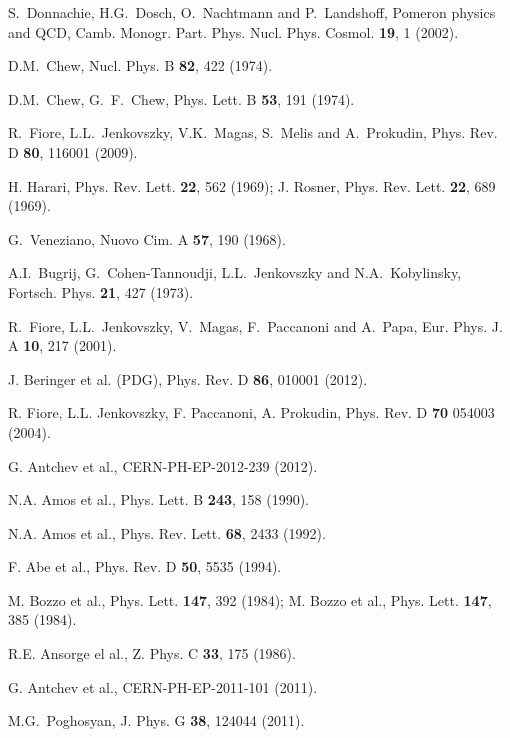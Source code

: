\documentclass[12pt]{article}
\begin{document}
\begin{thebibliography}{9}
  S.~Donnachie, H.G.~Dosch, O.~Nachtmann and P.~Landshoff,
   Pomeron physics and QCD,  Camb. Monogr. Part. Phys. Nucl. Phys. Cosmol. {\bf 19}, 1 (2002).

  D.M.~Chew,  Nucl. Phys.  B {\bf82}, 422 (1974).

  D.M.~Chew, G.~F.~Chew,
  Phys. Lett. B {\bf53}, 191 (1974).

  R.~Fiore, L.L.~Jenkovszky, V.K.~Magas, S.~Melis and A.~Prokudin, Phys. Rev. D {\bf80}, 116001 (2009).%
  
H. Harari, Phys. Rev. Lett. {\bf 22}, 562 (1969); J. Rosner, Phys. Rev. Lett. {\bf 22}, 689 (1969).

  G.~Veneziano,  Nuovo Cim. A {\bf57}, 190 (1968).
  
  A.I.~Bugrij, G.~Cohen-Tannoudji, L.L.~Jenkovszky and N.A.~Kobylinsky,  Fortsch. Phys.  {\bf 21}, 427 (1973).

R.~Fiore, L.L.~Jenkovszky, V.~Magas, F.~Paccanoni and A.~Papa, Eur. Phys. J. A {\bf10}, 217 (2001).%
  
J. Beringer et al. (PDG), Phys. Rev. D {\bf86}, 010001 (2012).

R. Fiore, L.L. Jenkovszky, F. Paccanoni, A. Prokudin,
 Phys. Rev. D {\bf70} 054003 (2004).%

G. Antchev et al., CERN-PH-EP-2012-239 (2012).

N.A. Amos et al., Phys. Lett. B {\bf243}, 158 (1990).

N.A. Amos et al., Phys. Rev. Lett. {\bf 68}, 2433 (1992).

F. Abe et al., Phys. Rev. D {\bf50}, 5535 (1994).

M. Bozzo et al., Phys. Lett. {\bf 147}, 392 (1984);
M. Bozzo et al., Phys. Lett. {\bf 147}, 385 (1984).

R.E. Ansorge el al., Z. Phys. C {\bf33}, 175 (1986).

G. Antchev et al., CERN-PH-EP-2011-101 (2011).

  M.G.~Poghosyan,  J. Phys. G {\bf38}, 124044 (2011).%


\end{thebibliography}
\end{document}
